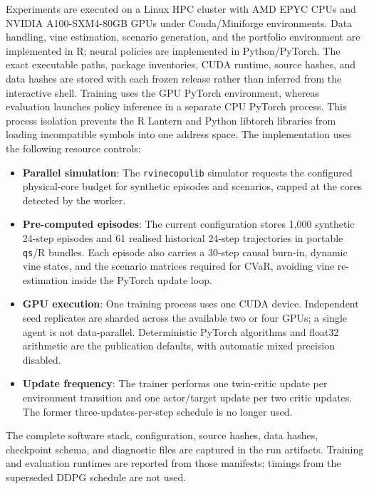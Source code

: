 Experiments are executed on a Linux HPC cluster with AMD EPYC CPUs and NVIDIA A100-SXM4-80GB GPUs under Conda/Miniforge environments. Data handling, vine estimation, scenario generation, and the portfolio environment are implemented in \textsf{R}; neural policies are implemented in \textsf{Python}/PyTorch. The exact executable paths, package inventories, CUDA runtime, source hashes, and data hashes are stored with each frozen release rather than inferred from the interactive shell. Training uses the GPU PyTorch environment, whereas evaluation launches policy inference in a separate CPU PyTorch process. This process isolation prevents the R Lantern and Python libtorch libraries from loading incompatible symbols into one address space. The implementation uses the following resource controls:
\begin{itemize}
    \item \textbf{Parallel simulation}: The \texttt{rvinecopulib} simulator requests the configured physical-core budget for synthetic episodes and scenarios, capped at the cores detected by the worker.
    \item \textbf{Pre-computed episodes}: The current configuration stores 1,000 synthetic 24-step episodes and 61 realised historical 24-step trajectories in portable \texttt{qs}/R bundles. Each episode also carries a 30-step causal burn-in, dynamic vine states, and the scenario matrices required for CVaR, avoiding vine re-estimation inside the PyTorch update loop.
    \item \textbf{GPU execution}: One training process uses one CUDA device. Independent seed replicates are sharded across the available two or four GPUs; a single agent is not data-parallel. Deterministic PyTorch algorithms and float32 arithmetic are the publication defaults, with automatic mixed precision disabled.
    \item \textbf{Update frequency}: The trainer performs one twin-critic update per environment transition and one actor/target update per two critic updates. The former three-updates-per-step schedule is no longer used.
\end{itemize}
The complete software stack, configuration, source hashes, data hashes, checkpoint schema, and diagnostic files are captured in the run artifacts. Training and evaluation runtimes are reported from those manifests; timings from the superseded DDPG schedule are not used.


